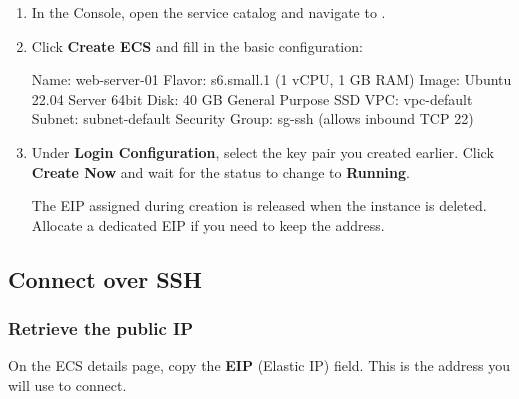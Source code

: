 \documentclass{guide}
\begin{document}

\stepbystep
\begin{enumerate}
  \item In the Console, open the service catalog and navigate to
        .


  \item Click \textbf{Create ECS} and fill in the basic configuration:

  \begin{code}
Name:           web-server-01
Flavor:         s6.small.1 (1 vCPU, 1 GB RAM)
Image:          Ubuntu 22.04 Server 64bit
Disk:           40 GB General Purpose SSD
VPC:            vpc-default
Subnet:         subnet-default
Security Group: sg-ssh (allows inbound TCP 22)
  \end{code}

  \item Under \textbf{Login Configuration}, select the key pair you created
        earlier. Click \textbf{Create Now} and wait for the status to change
        to \textbf{Running}.



  \begin{warning}
  The EIP assigned during creation is released when the instance is deleted.
  Allocate a dedicated EIP if you need to keep the address.
  \end{warning}
\end{enumerate}

\subsection{Connect over SSH}

\subsubsection{Retrieve the public IP}

On the ECS details page, copy the \textbf{EIP} (Elastic IP) field. This is
the address you will use to connect.
\end{document}
